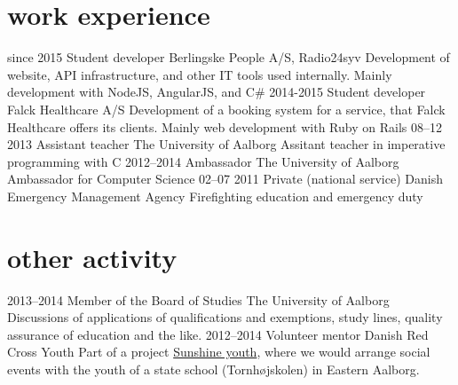 \documentclass[print]{friggeri-cv}
\begin{document}
\section{work experience}

\begin{entrylist}
  \entry
    {since 2015}
    {Student developer}
    {Berlingske People A/S, Radio24syv}
    {Development of website, API infrastructure, and other IT tools used internally. Mainly development with NodeJS, AngularJS, and C\#}
  \entry
    {2014-2015}
    {Student developer}
    {Falck Healthcare A/S}
    {Development of a booking system for a service, that Falck Healthcare offers its clients. Mainly web development with Ruby on Rails}
  \entry
    {08–12 2013}
    {Assistant teacher}
    {The University of Aalborg}
    {Assitant teacher in imperative programming with C}
  \entry
    {2012–2014}
    {Ambassador}
    {The University of Aalborg}
    {Ambassador for Computer Science}
  \entry
    {02–07 2011}
    {Private (national service)}
    {Danish Emergency Management Agency}
    {Firefighting education and emergency duty}
\end{entrylist}

\section{other activity}

\begin{entrylist}
  \entry
    {2013–2014}
    {Member of the Board of Studies}
    {The University of Aalborg}
    {Discussions of applications of qualifications and exemptions, study lines, quality assurance of education and the like.}
  \entry
    {2012–2014}
    {Volunteer mentor}
    {Danish Red Cross Youth}
    {Part of a project \href{http://www.urk.dk/solskinsunge/}{Sunshine youth}, where we would arrange social events with the youth of a state school (Tornhøjskolen) in Eastern Aalborg.}
\end{entrylist}
\end{document}
